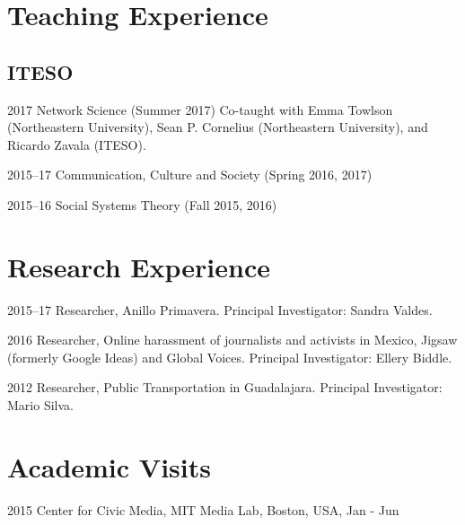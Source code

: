 \documentclass{academiccv}
\begin{document}
\section*{Teaching Experience}

\subsection*{ITESO}

\begin{tablist}
	
	\item[2017]	\tab Network Science (Summer 2017) Co-taught with Emma Towlson (Northeastern University), Sean P. Cornelius (Northeastern University), and Ricardo Zavala (ITESO).
	
	\item [2015--17]\tab Communication, Culture and Society (Spring 2016, 2017)
	
	\item [2015--16]\tab Social Systems Theory (Fall 2015, 2016)
	
	
\end{tablist}



\section*{Research Experience}

\begin{tablist}
	
\item[2015--17] 	\tab Researcher, Anillo Primavera. Principal Investigator: Sandra Valdes.

\item[2016] 	\tab Researcher, Online harassment of journalists and activists in Mexico, Jigsaw (formerly Google Ideas) and Global Voices. Principal Investigator: Ellery Biddle.

\item[2012] \tab Researcher, Public Transportation in Guadalajara. Principal Investigator: Mario Silva.

\end{tablist}


\section*{Academic Visits}

\begin{tablist}
	
	\item[2015] 	\tab Center for Civic Media, MIT Media Lab, Boston, USA, Jan - Jun
		
\end{tablist}
\end{document}
